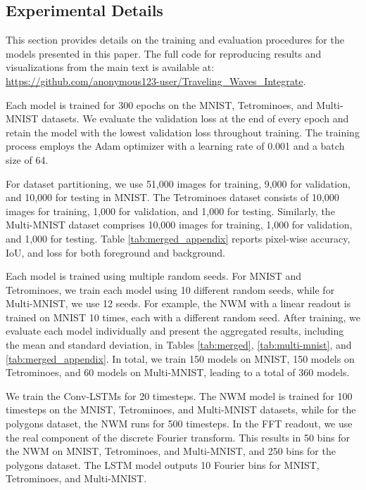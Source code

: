 \subsection{Experimental Details}

This section provides details on the training and evaluation procedures for the models presented in this paper. The full code for reproducing results and visualizations from the main text is available at: \url{https://github.com/anonymous123-user/Traveling_Waves_Integrate}.

Each model is trained for 300 epochs on the MNIST, Tetrominoes, and Multi-MNIST datasets. We evaluate the validation loss at the end of every epoch and retain the model with the lowest validation loss throughout training. The training process employs the Adam optimizer \citep{kingma_adam_2017} with a learning rate of 0.001 and a batch size of 64.

For dataset partitioning, we use 51,000 images for training, 9,000 for validation, and 10,000 for testing in MNIST. The Tetrominoes dataset consists of 10,000 images for training, 1,000 for validation, and 1,000 for testing. Similarly, the Multi-MNIST dataset comprises 10,000 images for training, 1,000 for validation, and 1,000 for testing. Table \ref{tab:merged_appendix} reports pixel-wise accuracy, IoU, and loss for both foreground and background.

Each model is trained using multiple random seeds. For MNIST and Tetrominoes, we train each model using 10 different random seeds, while for Multi-MNIST, we use 12 seeds. For example, the NWM with a linear readout is trained on MNIST 10 times, each with a different random seed. After training, we evaluate each model individually and present the aggregated results, including the mean and standard deviation, in Tables \ref{tab:merged}, \ref{tab:multi-mnist}, and \ref{tab:merged_appendix}. In total, we train 150 models on MNIST, 150 models on Tetrominoes, and 60 models on Multi-MNIST, leading to a total of 360 models.

We train the Conv-LSTMs for 20 timesteps. The NWM model is trained for 100 timesteps on the MNIST, Tetrominoes, and Multi-MNIST datasets, while for the polygons dataset, the NWM runs for 500 timesteps. In the FFT readout, we use the real component of the discrete Fourier transform. This results in 50 bins for the NWM on MNIST, Tetrominoes, and Multi-MNIST, and 250 bins for the polygons dataset. The LSTM model outputs 10 Fourier bins for MNIST, Tetrominoes, and Multi-MNIST.

